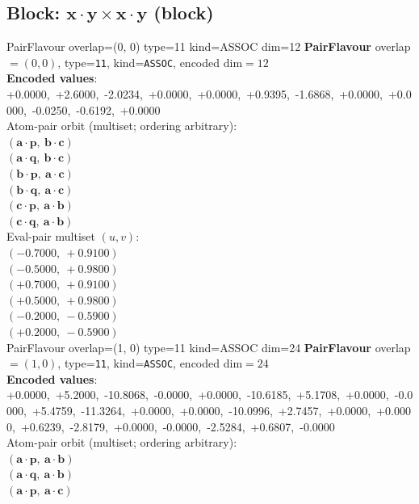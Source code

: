 \documentclass[a4paper,11pt]{article}
\newcommand{\pdcegfomjfhook}[2]{\mathbf{#1} \cdot \mathbf{#2}}
\begin{document}
\subsection{Block: $\pdcegfomjfhook{x}{y} \times \pdcegfomjfhook{x}{y}$  (block)}
    PairFlavour  overlap=(0, 0)  type=11  kind=ASSOC  dim=12
\textbf{PairFlavour} overlap$=(0, 0)$, type=\texttt{11}, kind=\texttt{ASSOC}, encoded dim$=12$\\
\textbf{      Encoded values}: +0.0000,\ +2.6000,\ -2.0234,\ +0.0000,\ +0.0000,\ +0.9395,\ -1.6868,\ +0.0000,\ +0.0000,\ -0.0250,\ -0.6192,\ +0.0000\\
\quad Atom-pair orbit (multiset; ordering arbitrary):\\
$(\pdcegfomjfhook{a}{p},\ \pdcegfomjfhook{b}{c})$\\
$(\pdcegfomjfhook{a}{q},\ \pdcegfomjfhook{b}{c})$\\
$(\pdcegfomjfhook{b}{p},\ \pdcegfomjfhook{a}{c})$\\
$(\pdcegfomjfhook{b}{q},\ \pdcegfomjfhook{a}{c})$\\
$(\pdcegfomjfhook{c}{p},\ \pdcegfomjfhook{a}{b})$\\
$(\pdcegfomjfhook{c}{q},\ \pdcegfomjfhook{a}{b})$\\
\quad Eval-pair multiset $(u, v)$:\\
$(-0.7000,\ +0.9100)$\\
$(-0.5000,\ +0.9800)$\\
$(+0.7000,\ +0.9100)$\\
$(+0.5000,\ +0.9800)$\\
$(-0.2000,\ -0.5900)$\\
$(+0.2000,\ -0.5900)$\\
    PairFlavour  overlap=(1, 0)  type=11  kind=ASSOC  dim=24
\textbf{PairFlavour} overlap$=(1, 0)$, type=\texttt{11}, kind=\texttt{ASSOC}, encoded dim$=24$\\
\textbf{      Encoded values}: +0.0000,\ +5.2000,\ -10.8068,\ -0.0000,\ +0.0000,\ -10.6185,\ +5.1708,\ +0.0000,\ -0.0000,\ +5.4759,\ -11.3264,\ +0.0000,\ +0.0000,\ -10.0996,\ +2.7457,\ +0.0000,\ +0.0000,\ +0.6239,\ -2.8179,\ +0.0000,\ -0.0000,\ -2.5284,\ +0.6807,\ -0.0000\\
\quad Atom-pair orbit (multiset; ordering arbitrary):\\
$(\pdcegfomjfhook{a}{p},\ \pdcegfomjfhook{a}{b})$\\
$(\pdcegfomjfhook{a}{q},\ \pdcegfomjfhook{a}{b})$\\
$(\pdcegfomjfhook{a}{p},\ \pdcegfomjfhook{a}{c})$\\
\end{document}
